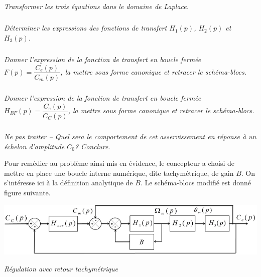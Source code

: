 \documentclass[10pt,fleqn]{article} %
\begin{document}
\begin{multicols}{2}
\subparagraph{}
\textit{Transformer les trois équations dans le domaine de Laplace.}
\ifprof
\begin{corrige}
\end{corrige}
\else
\fi

\subparagraph{}
\textit{Déterminer les expressions des fonctions de transfert $H_1(p)$, $H_2(p)$ et $H_3(p)$.}
\ifprof
\begin{corrige}
\end{corrige}
\else
\fi

\subparagraph{}
\textit{Donner l’expression de la fonction de transfert en boucle fermée $F(p)=\dfrac{C_e(p)}{C_m(p)}$, la mettre sous forme canonique et retracer le schéma-blocs.}

\ifprof
\begin{corrige}
\end{corrige}
\else
\fi


\subparagraph{}
\textit{Donner l’expression de la fonction de transfert en boucle fermée $H_{BF}(p)=\dfrac{C_e(p)}{C_C(p)}$, la mettre sous forme canonique et retracer le schéma-blocs.}

\ifprof
\begin{corrige}
\end{corrige}
\else
\fi

\subparagraph{}
\textit{Ne pas traiter -- Quel sera le comportement de cet asservissement en réponse à un échelon d'amplitude $C_0$?
Conclure.}
\ifprof
\begin{corrige}
\end{corrige}
\else
\fi

\vspace{.25cm}

Pour remédier au problème ainsi mis en évidence, le concepteur a choisi de mettre en place une boucle
interne numérique, dite tachymétrique, de gain $B$. On s’intéresse ici à la définition analytique de $B$.
Le schéma-blocs modifié est donné figure suivante.


\begin{center}
\includegraphics[width=\linewidth]{images/fig_07}

\textit{Régulation avec retour tachymétrique}
\end{center}



\end{multicols}
\end{document}
